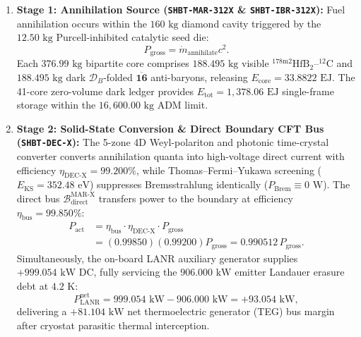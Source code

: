 \documentclass[11pt,onecolumn]{article}
\begin{document}
\begin{enumerate}
    \item \textbf{Stage 1: Annihilation Source (\texttt{SHBT-MAR-312X} \& \texttt{SHBT-IBR-312X}):}
    Fuel annihilation occurs within the $160\text{ kg}$ diamond cavity triggered by the $12.50\text{ kg}$ Purcell-inhibited catalytic seed die:
    \begin{equation}
        P_{\text{gross}} = \dot{m}_{\text{annihilate}} c^2.
        \label{eq:sim_p_gross}
    \end{equation}
    Each $376.99\text{ kg}$ bipartite core comprises $188.495\text{ kg}$ visible $^{178\text{m2}}\text{HfB}_2\text{--}^{12}\text{C}$ and $188.495\text{ kg}$ dark $\mathcal{D}_B$-folded $\mathbf{\overline{16}}$ anti-baryons, releasing $E_{\text{core}} = 33.8822\text{ EJ}$. The 41-core zero-volume dark ledger provides $E_{\text{tot}} = 1{,}378.06\text{ EJ}$ single-frame storage within the $16{,}600.00\text{ kg}$ ADM limit.

    \item \textbf{Stage 2: Solid-State Conversion \& Direct Boundary CFT Bus (\texttt{SHBT-DEC-X}):}
    The 5-zone 4D Weyl-polariton and photonic time-crystal converter converts annihilation quanta into high-voltage direct current with efficiency $\eta_{\text{DEC-X}} = 99.200\%$, while Thomas--Fermi--Yukawa screening ($E_{\text{KS}} = 352.48\text{ eV}$) suppresses Bremsstrahlung identically ($P_{\text{Brem}} \equiv 0\text{ W}$). The direct bus $\mathcal{B}_{\text{direct}}^{\text{MAR-X}}$ transfers power to the boundary at efficiency $\eta_{\text{bus}} = 99.850\%$:
    \begin{align}
        P_{\text{act}} &= \eta_{\text{bus}} \cdot \eta_{\text{DEC-X}} \cdot P_{\text{gross}} \nonumber \\
        &= (0.99850)(0.99200) P_{\text{gross}} = 0.990512\, P_{\text{gross}}.
        \label{eq:sim_p_act}
    \end{align}
    Simultaneously, the on-board LANR auxiliary generator supplies $+999.054\text{ kW}$ DC, fully servicing the $906.000\text{ kW}$ emitter Landauer erasure debt at $4.2\text{ K}$:
    \begin{equation}
        P_{\text{LANR}}^{\text{net}} = 999.054\text{ kW} - 906.000\text{ kW} = +93.054\text{ kW},
        \label{eq:sim_lanr_net}
    \end{equation}
    delivering a $+81.104\text{ kW}$ net thermoelectric generator (TEG) bus margin after cryostat parasitic thermal interception.


\end{enumerate}
\end{document}
